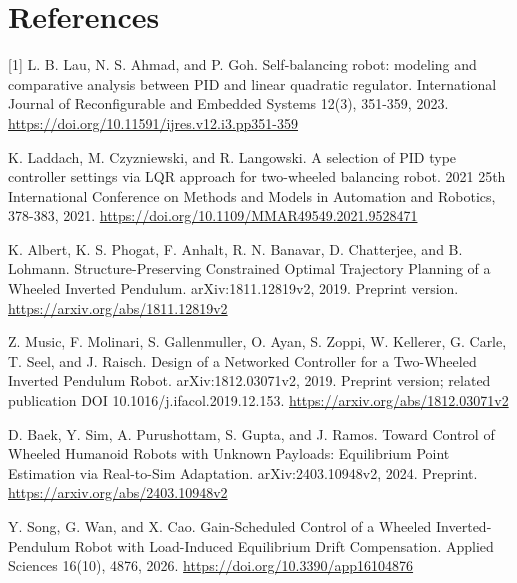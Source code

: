\documentclass[11pt,a4paper]{article}
\begin{document}
\section*{References}
[1] L. B. Lau, N. S. Ahmad, and P. Goh. Self-balancing robot: modeling and comparative analysis between PID and linear quadratic regulator. International Journal of Reconfigurable and Embedded Systems 12(3), 351-359, 2023. \url{https://doi.org/10.11591/ijres.v12.i3.pp351-359}\par
[2] K. Laddach, M. Czyzniewski, and R. Langowski. A selection of PID type controller settings via LQR approach for two-wheeled balancing robot. 2021 25th International Conference on Methods and Models in Automation and Robotics, 378-383, 2021. \url{https://doi.org/10.1109/MMAR49549.2021.9528471}\par
[3] K. Albert, K. S. Phogat, F. Anhalt, R. N. Banavar, D. Chatterjee, and B. Lohmann. Structure-Preserving Constrained Optimal Trajectory Planning of a Wheeled Inverted Pendulum. arXiv:1811.12819v2, 2019. Preprint version. \url{https://arxiv.org/abs/1811.12819v2}\par
[4] Z. Music, F. Molinari, S. Gallenmuller, O. Ayan, S. Zoppi, W. Kellerer, G. Carle, T. Seel, and J. Raisch. Design of a Networked Controller for a Two-Wheeled Inverted Pendulum Robot. arXiv:1812.03071v2, 2019. Preprint version; related publication DOI 10.1016/j.ifacol.2019.12.153. \url{https://arxiv.org/abs/1812.03071v2}\par
[5] D. Baek, Y. Sim, A. Purushottam, S. Gupta, and J. Ramos. Toward Control of Wheeled Humanoid Robots with Unknown Payloads: Equilibrium Point Estimation via Real-to-Sim Adaptation. arXiv:2403.10948v2, 2024. Preprint. \url{https://arxiv.org/abs/2403.10948v2}\par
[6] Y. Song, G. Wan, and X. Cao. Gain-Scheduled Control of a Wheeled Inverted-Pendulum Robot with Load-Induced Equilibrium Drift Compensation. Applied Sciences 16(10), 4876, 2026. \url{https://doi.org/10.3390/app16104876}\par
\end{document}
